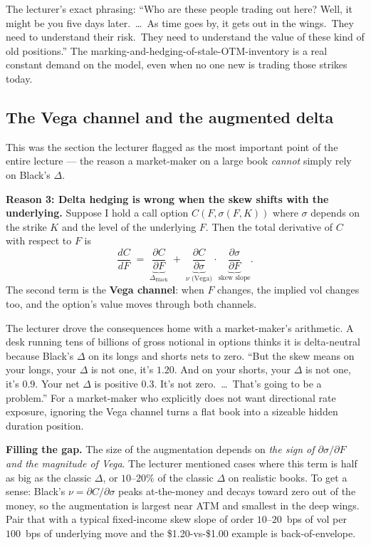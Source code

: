 The lecturer's exact phrasing: ``Who are these people trading out
here? Well, it might be you five days later.\ \ldots\ As time goes
by, it gets out in the wings.\ They need to understand their risk.\
They need to understand the value of these kind of old positions.''
The marking-and-hedging-of-stale-OTM-inventory is a real constant
demand on the model, even when no one new is trading those strikes
today.

\subsection{The Vega channel and the augmented delta}\label{L7-sec:vega-channel}

This was the section the lecturer flagged as the most important point
of the entire lecture --- the reason a market-maker on a large book
\emph{cannot} simply rely on Black's $\Delta$.

\begin{keyblock}
\textbf{Reason 3: Delta hedging is wrong when the skew shifts with the
underlying.}
Suppose I hold a call option $C(F, \sigma(F, K))$ where $\sigma$
depends on the strike $K$ and the level of the underlying $F$. Then
the total derivative of $C$ with respect to $F$ is
\[
  \frac{dC}{dF} \;=\;
     \underbrace{\frac{\partial C}{\partial F}}_{\Delta_{\text{Black}}}
     \;+\;
     \underbrace{\frac{\partial C}{\partial \sigma}}_{\nu \text{ (Vega)}}
     \cdot
     \underbrace{\frac{\partial \sigma}{\partial F}}_{\text{skew slope}}.
\]
The second term is the \textbf{Vega channel}: when $F$ changes, the
implied vol changes too, and the option's value moves through both
channels.
\end{keyblock}

The lecturer drove the consequences home with a market-maker's
arithmetic. A desk running tens of billions of gross notional in
options thinks it is delta-neutral because Black's $\Delta$ on its
longs and shorts nets to zero. ``But the skew means on your longs,
your $\Delta$ is not one, it's $1.20$. And on your shorts, your
$\Delta$ is not one, it's $0.9$. Your net $\Delta$ is positive $0.3$.
It's not zero.\ \ldots\ That's going to be a problem.'' For a
market-maker who explicitly does not want directional rate exposure,
ignoring the Vega channel turns a flat book into a sizeable hidden
duration position.

\begin{tipblock}
\textbf{Filling the gap.} The size of the augmentation depends on
\emph{the sign of $\partial \sigma / \partial F$ and the magnitude of
Vega}. The lecturer mentioned cases where this term is half as big as
the classic $\Delta$, or $10$--$20\%$ of the classic $\Delta$ on
realistic books. To get a sense: Black's $\nu = \partial C / \partial
\sigma$ peaks at-the-money and decays toward zero out of the money,
so the augmentation is largest near ATM and smallest in the deep
wings. Pair that with a typical fixed-income skew slope of order
$10$--$20$~bps of vol per $100$~bps of underlying move and the
\$1.20-vs-\$1.00 example is back-of-envelope.
\end{tipblock}


